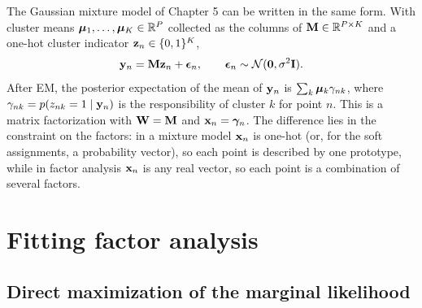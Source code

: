 The Gaussian mixture model of Chapter 5 can be written in the same form. With cluster means $\boldsymbol{\mu}_1,\dots,\boldsymbol{\mu}_K\in\mathbb{R}^P$ collected as the columns of $\mathbf{M}\in\mathbb{R}^{P\times K}$ and a one-hot cluster indicator $\mathbf{z}_n\in\{0,1\}^K$,
\begin{equation}
  \mathbf{y}_n = \mathbf{M}\mathbf{z}_n+\boldsymbol{\epsilon}_n, \qquad \boldsymbol{\epsilon}_n\sim\mathcal{N}(\mathbf{0},\sigma^2\mathbf{I}).
\end{equation}
After EM, the posterior expectation of the mean of $\mathbf{y}_n$ is $\sum_k\boldsymbol{\mu}_k\gamma_{nk}$, where $\gamma_{nk}=p(z_{nk}=1\mid\mathbf{y}_n)$ is the responsibility of cluster $k$ for point $n$. This is a matrix factorization with $\mathbf{W}=\mathbf{M}$ and $\mathbf{x}_n=\boldsymbol{\gamma}_n$. The difference lies in the constraint on the factors: in a mixture model $\mathbf{x}_n$ is one-hot (or, for the soft assignments, a probability vector), so each point is described by one prototype, while in factor analysis $\mathbf{x}_n$ is any real vector, so each point is a combination of several factors.

\section{Fitting factor analysis}
\label{sec:fa_fit}

\subsection{Direct maximization of the marginal likelihood}

